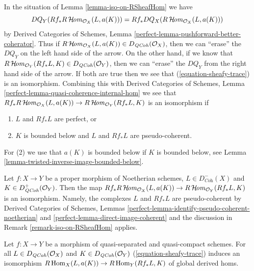 \begin{remark}
\label{remark-iso-on-RSheafHom}
In the situation of Lemma \ref{lemma-iso-on-RSheafHom} we have
$$
DQ_Y(Rf_*R\mathop{\mathcal{H}\!\mathit{om}}\nolimits_{\mathcal{O}_X}(L, a(K))) =
Rf_* DQ_X(R\mathop{\mathcal{H}\!\mathit{om}}\nolimits_{\mathcal{O}_X}(L, a(K)))
$$
by Derived Categories of Schemes, Lemma
\ref{perfect-lemma-pushforward-better-coherator}.
Thus if $R\mathop{\mathcal{H}\!\mathit{om}}\nolimits_{\mathcal{O}_X}(L, a(K)) \in D_{\mathit{QCoh}}(\mathcal{O}_X)$,
then we can ``erase'' the $DQ_Y$ on the left hand side of the arrow.
On the other hand, if we know that
$R\mathop{\mathcal{H}\!\mathit{om}}\nolimits_{\mathcal{O}_Y}(Rf_*L, K) \in D_{\mathit{QCoh}}(\mathcal{O}_Y)$,
then we can ``erase'' the $DQ_Y$ from the right hand side of the arrow.
If both are true then we see that (\ref{equation-sheafy-trace})
is an isomorphism. Combining this with
Derived Categories of Schemes, Lemma
\ref{perfect-lemma-quasi-coherence-internal-hom}
we see that $Rf_*R\mathop{\mathcal{H}\!\mathit{om}}\nolimits_{\mathcal{O}_X}(L, a(K)) \to
R\mathop{\mathcal{H}\!\mathit{om}}\nolimits_{\mathcal{O}_Y}(Rf_*L, K)$ is an isomorphism if
\begin{enumerate}
\item $L$ and $Rf_*L$ are perfect, or
\item $K$ is bounded below and $L$ and $Rf_*L$ are pseudo-coherent.
\end{enumerate}
For (2) we use that $a(K)$ is bounded below if $K$
is bounded below, see Lemma \ref{lemma-twisted-inverse-image-bounded-below}.
\end{remark}

\begin{example}
\label{example-iso-on-RSheafHom-noetherian}
Let $f : X \to Y$ be a proper morphism of Noetherian schemes,
$L \in D^-_{\textit{Coh}}(X)$ and $K \in D^+_{\mathit{QCoh}}(\mathcal{O}_Y)$.
Then the map $Rf_*R\mathop{\mathcal{H}\!\mathit{om}}\nolimits_{\mathcal{O}_X}(L, a(K)) \to
R\mathop{\mathcal{H}\!\mathit{om}}\nolimits_{\mathcal{O}_Y}(Rf_*L, K)$ is an isomorphism.
Namely, the complexes $L$ and $Rf_*L$ are pseudo-coherent by
Derived Categories of Schemes, Lemmas
\ref{perfect-lemma-identify-pseudo-coherent-noetherian} and
\ref{perfect-lemma-direct-image-coherent}
and the discussion in Remark \ref{remark-iso-on-RSheafHom} applies.
\end{example}

\begin{lemma}
\label{lemma-iso-global-hom}
Let $f : X \to Y$ be a morphism of quasi-separated and quasi-compact
schemes.
For all $L \in D_{\mathit{QCoh}}(\mathcal{O}_X)$ and $K \in D_{\mathit{QCoh}}(\mathcal{O}_Y)$
(\ref{equation-sheafy-trace}) induces an isomorphism
$R\mathop{\mathrm{Hom}}\nolimits_X(L, a(K)) \to R\mathop{\mathrm{Hom}}\nolimits_Y(Rf_*L, K)$ of global derived homs.
\end{lemma}

